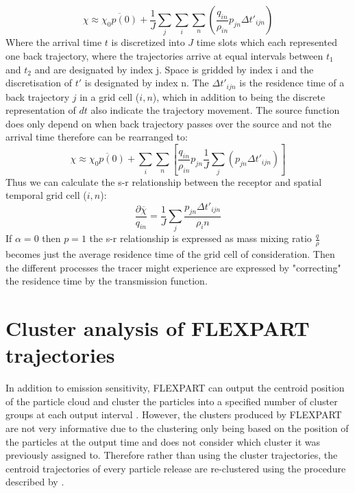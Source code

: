 \begin{equation}\label{eq:discrete_mix_ratio}
    \chi \approx \overline{\chi_0p(0)} + \frac{1}{J} \sum_j \sum_i \sum_n \left(\frac{q_{in}}{\rho_{in}}p_{jn}\Delta t'_{ijn}\right)
\end{equation}
Where the arrival time $t$ is discretized into $J$ time slots which each represented one back trajectory, where the trajectories arrive at equal intervals between $t_1$ and $t_2$ and are designated by index j. Space is gridded by index i and the discretisation of $t'$ is designated by index n. The $\Delta t'_{ijn}$ is the residence time of a back trajectory $j$ in a grid cell ($i,n$), which in addition to being the discrete representation of $dt$ also indicate the trajectory movement. The source function does only depend on when back trajectory passes over the source and not the arrival time therefore  can be rearranged to:
\begin{equation}
    \chi \approx \overline{\chi_0p(0)} + \sum_i \sum_n \left[\frac{q_{in}}{\rho_{in}}p_{jn} \frac{1}{J}\sum_j (p_{jn}\Delta t'_{ijn})\right]
\end{equation}
Thus we can calculate the s-r relationship between the receptor and spatial temporal grid cell ($i,n$):
\begin{equation}
    \frac{\partial \overline{\chi}}{q_{in}} = \frac{1}{J} \sum_j \frac{p_{jn} \Delta t'_{ijn}}{\rho_in}
\end{equation}
If $\alpha=0$ then $p=1$ the s-r relationship is expressed as mass mixing ratio $\frac{q}{\rho}$ becomes just the average residence time of the grid cell of consideration. Then the different processes the tracer might experience are expressed by "correcting" the residence time by the transmission function. 


\chapter{Cluster analysis of FLEXPART trajectories}\label{chap:trajec_analysis}

In addition to emission sensitivity, FLEXPART can output the centroid position of the particle cloud and cluster the particles into a specified number of cluster groups at each output interval \parencite{stohl_replacement_2002}. However, the clusters produced by FLEXPART are not very informative due to the clustering only being based on the position of the particles at the output time and does not consider which cluster it was previously assigned to. Therefore rather than using the cluster trajectories, the centroid trajectories of every particle release are re-clustered using the procedure described by \textcite{dorling1992cluster}. 

